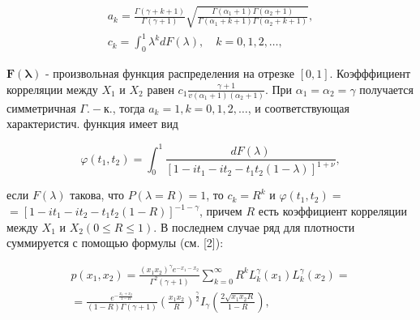 \documentclass[10pt]{article}
\begin{document}
\[

\begin{gathered}

a_{k}=\frac{\Gamma(\gamma+k+1)}{\Gamma(\gamma+1)} \sqrt{\frac{\Gamma\left(\alpha_{1}+1\right) \Gamma\left(\alpha_{2}+1\right)}{\Gamma\left(\alpha_{1}+k+1\right) \Gamma\left(\alpha_{2}+k+1\right)}}, \\

c_{k}=\int_{0}^{1} \lambda^{k} d F(\lambda), \quad k=0,1,2, \ldots,

\end{gathered}

\]



$\boldsymbol{F}(\boldsymbol{\lambda})$ - произвольная функция распределения на отрезке $[0,1]$. Коэфффициент корреляции между $X_{1}$ и $X_{2}$ равен $c_{1} \frac{\gamma+1}{v\left(\alpha_{1}+1\right)\left(\alpha_{2}+1\right)}$. При $\alpha_{1}=\alpha_{2}=\gamma$ получается симметричная $\Gamma .-к .$, тогда $a_{k}=1, k=0,1,2, \ldots$, и соответствующая характеристич. функция имеет вид



\[

\varphi\left(t_{1}, t_{2}\right)=\int_{0}^{1} \frac{d F(\lambda)}{\left[1-i t_{1}-i t_{2}-t_{1} t_{2}(1-\lambda)\right]^{1+\nu}},

\]



если $F(\lambda)$ такова, что $P(\lambda=R)=1$, то $c_{k}=R^{k}$ и $\varphi\left(t_{1}, t_{2}\right)=$ $=\left[1-i t_{1}-i t_{2}-t_{1} t_{2}(1-R)\right]^{-1-\gamma}$, причем $R$ есть коэффициент корреляции между $X_{1}$ и $X_{2}(0 \leqslant R \leqslant 1)$. В последнем случае ряд для плотности суммируется с помощью формулы (см. [2]):



\[

\begin{gathered}

p\left(x_{1}, x_{2}\right)=\frac{\left(x_{1} x_{2}\right)^{\gamma} e^{-x_{1}-x_{2}}}{\Gamma^{2}(\gamma+1)} \sum_{k=0}^{\infty} R^{k} L_{k}^{\gamma}\left(x_{1}\right) L_{k}^{\gamma}\left(x_{2}\right)= \\

=\frac{e^{-\frac{x_{1}+x_{2}}{1-R}}}{(1-R) \Gamma(\gamma+1)}\left(\frac{x_{1} x_{2}}{R}\right)^{\frac{\gamma}{2}} I_{\gamma}\left(\frac{2 \sqrt{x_{1} x_{2} R}}{1-R}\right),

\end{gathered}

\]
\end{document}
